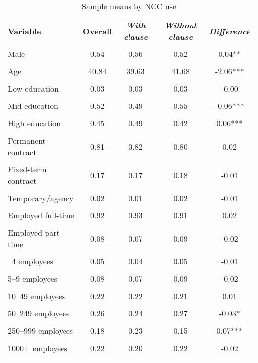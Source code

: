 \begin{table}[!ht]\centering
\caption{Sample means by NCC use}
\label{tab:sample_means_ncc_Poland} %
\begin{tabular}{lcccc}\toprule
\textbf{Variable} & \textbf{Overall} & \textbf{\textit{With clause}} & \textbf{\textit{Without clause}} & \textbf{\textit{Difference}} \\\\ \midrule
Male & 0.54 & 0.56 & 0.52 & 0.04** \\\\
Age & 40.84 & 39.63 & 41.68 & -2.06*** \\\\
\addlinespace
Low education & 0.03 & 0.03 & 0.03 & -0.00 \\\\
Mid education & 0.52 & 0.49 & 0.55 & -0.06*** \\\\
High education & 0.45 & 0.49 & 0.42 & 0.06*** \\\\
\addlinespace
Permanent contract & 0.81 & 0.82 & 0.80 & 0.02 \\\\
Fixed-term contract & 0.17 & 0.17 & 0.18 & -0.01 \\\\
Temporary/agency & 0.02 & 0.01 & 0.02 & -0.01 \\\\
\addlinespace
Employed full-time & 0.92 & 0.93 & 0.91 & 0.02 \\\\
Employed part-time & 0.08 & 0.07 & 0.09 & -0.02 \\\\
\addlinespace
1–4 employees & 0.05 & 0.04 & 0.05 & -0.01 \\\\
5–9 employees & 0.08 & 0.07 & 0.09 & -0.02 \\\\
10–49 employees & 0.22 & 0.22 & 0.21 & 0.01 \\\\
50–249 employees & 0.26 & 0.24 & 0.27 & -0.03* \\\\
250–999 employees & 0.18 & 0.23 & 0.15 & 0.07*** \\\\
1000+ employees & 0.22 & 0.20 & 0.22 & -0.02 \\\\
\bottomrule\end{tabular}\end{table}
